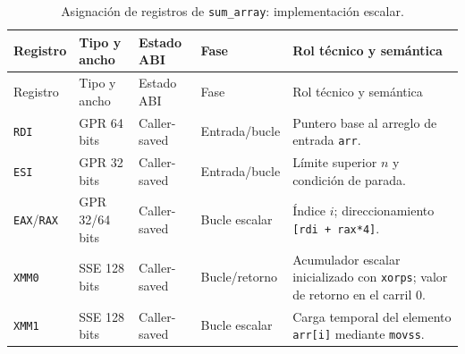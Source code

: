 \documentclass[journal]{IEEEtran}
\begin{document}
\begin{longtable}{@{}>{\raggedright\arraybackslash}p{}
  >{\raggedright\arraybackslash}p{}
  >{\raggedright\arraybackslash}p{}
  >{\raggedright\arraybackslash}p{}
  >{\raggedright\arraybackslash}p{}@{}}
\caption{Asignación de registros de \texttt{sum\_array}: implementación escalar.}
\label{tab:sum-array-scalar-registers}\\
\toprule
Registro & Tipo y ancho & Estado ABI & Fase & Rol técnico y semántica \\
\midrule
\endfirsthead
\toprule
Registro & Tipo y ancho & Estado ABI & Fase & Rol técnico y semántica \\
\midrule
\endhead
\bottomrule
\endfoot
\texttt{RDI} & GPR 64 bits & Caller-saved & Entrada/bucle & Puntero base
  al arreglo de entrada \texttt{arr}. \\
\texttt{ESI} & GPR 32 bits & Caller-saved & Entrada/bucle & Límite superior
  $n$ y condición de parada. \\
\texttt{EAX}/\texttt{RAX} & GPR 32/64 bits & Caller-saved & Bucle escalar &
  Índice $i$; direccionamiento \texttt{[rdi + rax*4]}. \\
\texttt{XMM0} & SSE 128 bits & Caller-saved & Bucle/retorno & Acumulador
  escalar inicializado con \texttt{xorps}; valor de retorno en el carril 0. \\
\texttt{XMM1} & SSE 128 bits & Caller-saved & Bucle escalar & Carga temporal
  del elemento \texttt{arr[i]} mediante \texttt{movss}. \\
\end{longtable}
\end{document}
